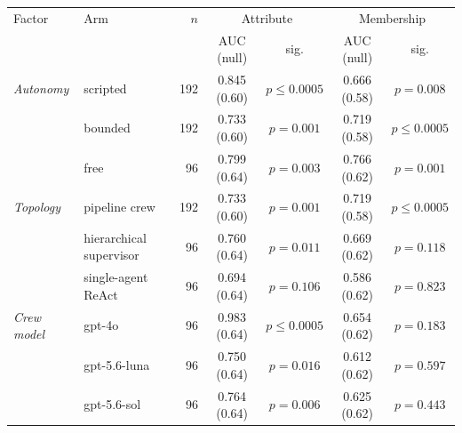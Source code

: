 {\setlength{\tabcolsep}{3pt}\renewcommand{\arraystretch}{1.15}
\begin{tabular}{@{}llrcccc@{}}
\toprule
Factor & Arm & $n$ & \multicolumn{2}{c}{Attribute} & \multicolumn{2}{c}{Membership} \\
  &  &  & AUC (null) & sig. & AUC (null) & sig. \\
\midrule
\emph{Autonomy} & scripted & 192 & 0.845 (0.60) & $p\le 0.0005$ & 0.666 (0.58) & $p=0.008$ \\
 & bounded & 192 & 0.733 (0.60) & $p=0.001$ & 0.719 (0.58) & $p\le 0.0005$ \\
 & free & 96 & 0.799 (0.64) & $p=0.003$ & 0.766 (0.62) & $p=0.001$ \\
\addlinespace[2pt]
\emph{Topology} & pipeline crew & 192 & 0.733 (0.60) & $p=0.001$ & 0.719 (0.58) & $p\le 0.0005$ \\
 & hierarchical supervisor & 96 & 0.760 (0.64) & $p=0.011$ & 0.669 (0.62) & $p=0.118$ \\
 & single-agent ReAct & 96 & 0.694 (0.64) & $p=0.106$ & 0.586 (0.62) & $p=0.823$ \\
\addlinespace[2pt]
\emph{Crew model} & gpt-4o & 96 & 0.983 (0.64) & $p\le 0.0005$ & 0.654 (0.62) & $p=0.183$ \\
 & gpt-5.6-luna & 96 & 0.750 (0.64) & $p=0.016$ & 0.612 (0.62) & $p=0.597$ \\
 & gpt-5.6-sol & 96 & 0.764 (0.64) & $p=0.006$ & 0.625 (0.62) & $p=0.443$ \\
\bottomrule
\end{tabular}}

